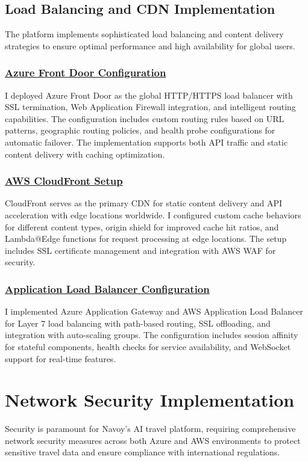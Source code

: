 \subsection{Load Balancing and CDN Implementation}
The platform implements sophisticated load balancing and content delivery strategies to ensure optimal performance and high availability for global users.

\subsubsection*{\underline{Azure Front Door Configuration}}
I deployed Azure Front Door as the global HTTP/HTTPS load balancer with SSL termination, Web Application Firewall integration, and intelligent routing capabilities. The configuration includes custom routing rules based on URL patterns, geographic routing policies, and health probe configurations for automatic failover. The implementation supports both API traffic and static content delivery with caching optimization.

\subsubsection*{\underline{AWS CloudFront Setup}}
CloudFront serves as the primary CDN for static content delivery and API acceleration with edge locations worldwide. I configured custom cache behaviors for different content types, origin shield for improved cache hit ratios, and Lambda@Edge functions for request processing at edge locations. The setup includes SSL certificate management and integration with AWS WAF for security.

\subsubsection*{\underline{Application Load Balancer Configuration}}
I implemented Azure Application Gateway and AWS Application Load Balancer for Layer 7 load balancing with path-based routing, SSL offloading, and integration with auto-scaling groups. The configuration includes session affinity for stateful components, health checks for service availability, and WebSocket support for real-time features.

\section{Network Security Implementation}
Security is paramount for Navoy's AI travel platform, requiring comprehensive network security measures across both Azure and AWS environments to protect sensitive travel data and ensure compliance with international regulations.

